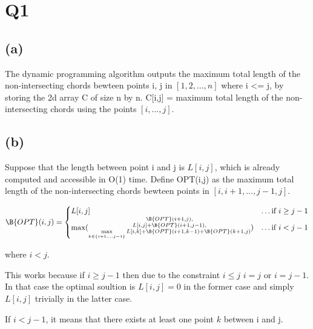 \section*{Q1}

\subsection*{(a)}

The dynamic programming algorithm outputs the maximum total length 
of the non-intersecting chords bewteen points i, j in $[1, 2, ..., n]$
where i <= j, by storing the 2d array C of size n by n. 
C[i,j] = maximum total length of the non-intersecting chords using the points $[i , ... , j]$.


\subsection*{(b)}

Suppose that the length between point i and j is $L[i,j]$, which is already computed and accessible in O(1) time.
Define OPT(i,j) as the maximum total length of the non-intersecting chords bewteen points in $[i, i+1, ..., j-1, j]$.

\begin{equation}
    \begin{split}
        \B{OPT}(i, j) = \begin{cases}
                        L[i, j] & \dots \text{if } i \geq j - 1\\
                    \max(\substack{\B{OPT}(i + 1, j), \\
                                   L[i, j] + \B{OPT}(i + 1, j - 1), \\
                                   \max\limits_{k \in \{i + 1, ... j - 1\}} L[i,k] + \B{OPT}(i + 1, k - 1) + \B{OPT}(k + 1, j)}) & \dots \text{if } i < j - 1
                    \end{cases}
    \end{split}
\end{equation}

where $i < j$.

This works because if $i \geq j - 1$ then due to the constraint $i \leq j$
$i = j$ or $i = j - 1$. In that case the optimal soultion is $L[i, j] = 0$ in the former case and simply $L[i,j]$ trivially in the latter case.

If $i < j - 1$, it means that there exists at least one point $k$ between i and j.

